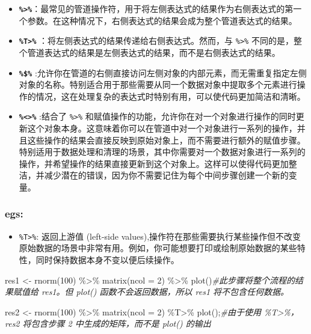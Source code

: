 \documentclass[
]{article}
\newenvironment{Shaded}{}{}
\newcommand{\AttributeTok}[1]{\textcolor[rgb]{0.49,0.56,0.16}{#1}}
\newcommand{\CommentTok}[1]{\textcolor[rgb]{0.38,0.63,0.69}{\textit{#1}}}
\newcommand{\DecValTok}[1]{\textcolor[rgb]{0.25,0.63,0.44}{#1}}
\newcommand{\FunctionTok}[1]{\textcolor[rgb]{0.02,0.16,0.49}{#1}}
\newcommand{\NormalTok}[1]{#1}
\newcommand{\OtherTok}[1]{\textcolor[rgb]{0.00,0.44,0.13}{#1}}
\newcommand{\SpecialCharTok}[1]{\textcolor[rgb]{0.25,0.44,0.63}{#1}}
\begin{document}
\begin{itemize}
\item
  \textbf{\texttt{\%\textgreater{}\%}}：最常见的管道操作符，用于将左侧表达式的结果作为右侧表达式的第一个参数。在这种情况下，右侧表达式的结果会成为整个管道表达式的结果。
\item
  \textbf{\texttt{\%T\textgreater{}\%}
  }：将左侧表达式的结果传递给右侧表达式。然而，与
  \texttt{\%\textgreater{}\%}
  不同的是，整个管道表达式的结果是左侧表达式的结果，而不是右侧表达式的结果。
\item
  \textbf{\texttt{\%\$\%}
  }:允许你在管道的右侧直接访问左侧对象的内部元素，而无需重复指定左侧对象的名称。特别适合用于那些需要从同一个数据对象中提取多个元素进行操作的情况，这在处理复杂的表达式时特别有用，可以使代码更加简洁和清晰。
\item
  \textbf{\texttt{\%\textless{}\textgreater{}\%} }:结合了
  \texttt{\%\textgreater{}\%}
  和赋值操作的功能，允许你在对一个对象进行操作的同时更新这个对象本身。这意味着你可以在管道中对一个对象进行一系列的操作，并且这些操作的结果会直接反映到原始对象上，而不需要进行额外的赋值步骤。特别适用于数据处理和清理的场景，其中你需要对一个数据对象进行一系列的操作，并希望操作的结果直接更新到这个对象上。这样可以使得代码更加整洁，并减少潜在的错误，因为你不需要记住为每个中间步骤创建一个新的变量。
\end{itemize}

\hypertarget{egs}{%
\subsubsection{egs:}\label{egs}}

\begin{itemize}
\item
  \texttt{\%T\textgreater{}\%}: 返回上游值 (left-side
  values),操作符在那些需要执行某些操作但不改变原始数据的场景中非常有用。例如，你可能想要打印或绘制原始数据的某些特性，同时保持数据本身不变以便后续操作。
\end{itemize}

\begin{Shaded}
\begin{Highlighting}[]
\NormalTok{res1 }\OtherTok{\textless{}{-}} 
  \FunctionTok{rnorm}\NormalTok{(}\DecValTok{100}\NormalTok{) }\SpecialCharTok{\%\textgreater{}\%}
    \FunctionTok{matrix}\NormalTok{(}\AttributeTok{ncol =} \DecValTok{2}\NormalTok{) }\SpecialCharTok{\%\textgreater{}\%}
    \FunctionTok{plot}\NormalTok{()}\CommentTok{\#此步骤将整个流程的结果赋值给 res1。但 plot() 函数不会返回数据，所以 res1 将不包含任何数据。}

\NormalTok{res2 }\OtherTok{\textless{}{-}} 
  \FunctionTok{rnorm}\NormalTok{(}\DecValTok{100}\NormalTok{) }\SpecialCharTok{\%\textgreater{}\%}
    \FunctionTok{matrix}\NormalTok{(}\AttributeTok{ncol =} \DecValTok{2}\NormalTok{) }\SpecialCharTok{\%T\textgreater{}\%}
    \FunctionTok{plot}\NormalTok{();}\CommentTok{\#由于使用 \%T\textgreater{}\%，res2 将包含步骤 2 中生成的矩阵，而不是 plot() 的输出}
\end{Highlighting}
\end{Shaded}
\end{document}
